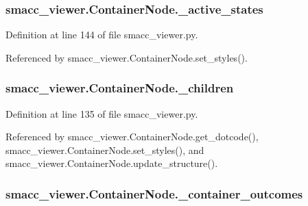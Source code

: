 \subsubsection[{\texorpdfstring{\+\_\+active\+\_\+states}{_active_states}}]{\setlength{\rightskip}{0pt plus 5cm}smacc\+\_\+viewer.\+Container\+Node.\+\_\+active\+\_\+states\hspace{0.3cm}{\ttfamily [private]}}\hypertarget{classsmacc__viewer_1_1ContainerNode_ad4607ee25bd9dd1f1c54ac72ca1ba5aa}{}\label{classsmacc__viewer_1_1ContainerNode_ad4607ee25bd9dd1f1c54ac72ca1ba5aa}


Definition at line 144 of file smacc\+\_\+viewer.\+py.



Referenced by smacc\+\_\+viewer.\+Container\+Node.\+set\+\_\+styles().

\subsubsection[{\texorpdfstring{\+\_\+children}{_children}}]{\setlength{\rightskip}{0pt plus 5cm}smacc\+\_\+viewer.\+Container\+Node.\+\_\+children\hspace{0.3cm}{\ttfamily [private]}}\hypertarget{classsmacc__viewer_1_1ContainerNode_a886cb99815f827d99bcd4c3e341284f1}{}\label{classsmacc__viewer_1_1ContainerNode_a886cb99815f827d99bcd4c3e341284f1}


Definition at line 135 of file smacc\+\_\+viewer.\+py.



Referenced by smacc\+\_\+viewer.\+Container\+Node.\+get\+\_\+dotcode(), smacc\+\_\+viewer.\+Container\+Node.\+set\+\_\+styles(), and smacc\+\_\+viewer.\+Container\+Node.\+update\+\_\+structure().

\subsubsection[{\texorpdfstring{\+\_\+container\+\_\+outcomes}{_container_outcomes}}]{\setlength{\rightskip}{0pt plus 5cm}smacc\+\_\+viewer.\+Container\+Node.\+\_\+container\+\_\+outcomes\hspace{0.3cm}{\ttfamily [private]}}\hypertarget{classsmacc__viewer_1_1ContainerNode_afc173014e336c7c3ab6a5d2dd1798d63}{}\label{classsmacc__viewer_1_1ContainerNode_afc173014e336c7c3ab6a5d2dd1798d63}


